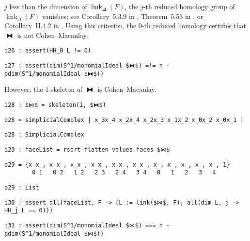 \documentclass[12pt,leqno]{amsart}
\theoremstyle{definition}
\begin{document}
$j$ less than the dimension of $\operatorname{link}_\Delta(F)$, the $j$-th
reduced homology group of $\operatorname{link}_\Delta(F)$ vanishes; see
Corollary~5.3.9 in \cite{BH}, Theorem~5.53 in \cite{MS}, or Corollary~II.4.2
in \cite{Stanley}.  Using this criterion, the $0$-th reduced homology
certifies that $⧓$ is not Cohen--Macaulay.
\begin{lstlisting}[xleftmargin=10pt, aboveskip=3.0pt, belowskip=1.5pt]
i26 : assert(HH_0 L != 0)
\end{lstlisting}
\begin{lstlisting}[xleftmargin=10pt, aboveskip=1.5pt, belowskip=3.0pt]
i27 : assert(dim(S^1/monomialIdeal $⧓$) =!= n - pdim(S^1/monomialIdeal $⧓$))
\end{lstlisting}
However, the $1$-skeleton of $⧓$ is Cohen--Macaulay.
\begin{lstlisting}[xleftmargin=10pt, aboveskip=3.0pt, belowskip=1.5pt]
i28 : $⋈$ = skeleton(1, $⧓$)
\end{lstlisting}
\begin{lstlisting}[xleftmargin=10pt, aboveskip=1.5pt, belowskip=1.5pt]
o28 = simplicialComplex | x_3x_4 x_2x_4 x_2x_3 x_1x_2 x_0x_2 x_0x_1 |
\end{lstlisting}
\begin{lstlisting}[xleftmargin=10pt, aboveskip=1.5pt, belowskip=1.5pt]
o28 : SimplicialComplex
\end{lstlisting}
\begin{lstlisting}[xleftmargin=10pt, aboveskip=1.5pt, belowskip=1.5pt]
i29 : faceList = rsort flatten values faces $⋈$
\end{lstlisting}
\begin{lstlisting}[xleftmargin=10pt, lineskip=-10pt, aboveskip=4pt, belowskip=1pt]
o29 = {x x , x x , x x , x x , x x , x x , x , x , x , x , x , 1}
        0 1   0 2   1 2   2 3   2 4   3 4   0   1   2   3   4
\end{lstlisting}
\begin{lstlisting}[xleftmargin=10pt, aboveskip=1.5pt, belowskip=1.5pt]
o29 : List
\end{lstlisting}
\begin{lstlisting}[xleftmargin=10pt, aboveskip=1.5pt, belowskip=1.5pt]
i30 : assert all(faceList, F -> (L := link($⋈$, F); all(dim L, j -> HH_j L == 0)))
\end{lstlisting}
\begin{lstlisting}[xleftmargin=10pt, aboveskip=1.5pt, belowskip=3.0pt]
i31 : assert(dim(S^1/monomialIdeal $⋈$) === n - pdim(S^1/monomialIdeal $⋈$))
\end{lstlisting}
\end{document}
